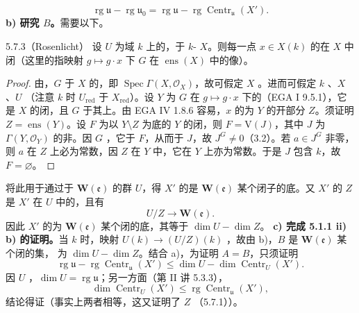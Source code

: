 \[\operatorname{rg}\mathfrak u-\operatorname{rg}\mathfrak u_0
=\operatorname{rg}\mathfrak u-\operatorname{rg}\operatorname{Centr}_{\mathfrak u}(X').\]
\textbf{b) 研究 $B$。}需要以下。
\begin{SGAresult}{}{5.7.3（Rosenlicht）}
设 $U$ 为域 $k$ 上的，于 $k$- $X$。则每一点 $x\in X(k)$ 的在 $X$ 中闭（这里的指映射 $g\mapsto g\cdot x$ 下 $G$ 在 $\operatorname{ens}(X)$ 中的像）。
\end{SGAresult}
\begin{proof}
由，$G$ 于 $X$ 的，即 $\operatorname{Spec}\Gamma(X,\mathscr O_X)$，故可假定 $X$ 。进而可假定 $k$ 、$X$ 、$U$ （注意 $k$ 时 $U_{\mathrm{red}}$ 于 $X_{\mathrm{red}}$）。设 $Y$ 为 $G$ 在 $g\mapsto g\cdot x$ 下的（EGA I 9.5.1），它是 $X$ 的闭，且 $G$ 于其上。由 EGA IV 1.8.6 容易，$x$ 的为 $Y$ 的开部分 $Z$。须证明 $Z=\operatorname{ens}(Y)$。设 $F$ 为以 $Y\setminus Z$ 为底的 $Y$ 的闭，则 $F=\mathrm V(J)$，其中 $J$ 为 $\Gamma(Y,\mathscr O_Y)$ 的非。因 $G$ ，它于 $F$，从而于 $J$，故 $J^G\ne0$（3.2）。若 $a\in J^G$ 非零，则 $a$ 在 $Z$ 上必为常数，因 $Z$ 在 $Y$ 中，它在 $Y$ 上亦为常数。于是 $J$ 包含 $k$，故 $F=\varnothing$。
\end{proof}
将此用于通过于 $\mathbf W(\mathfrak e)$ 的群 $U$，得 $X'$ 的是 $\mathbf W(\mathfrak e)$ 某个闭子的底。又 $X'$ 的 $Z$ 是 $X'$ 在 $U$ 中的，且有
\[U/Z\longrightarrow\mathbf W(\mathfrak e).\]
因此 $X'$ 的为 $\mathbf W(\mathfrak e)$ 某个闭的底，其等于 $\dim U-\dim Z$。
\textbf{c) 完成 5.1.1 ii) b) 的证明。}当 $k$ 时，映射 $U(k)\to(U/Z)(k)$ ，故由 b)，$B$ 是 $\mathbf W(\mathfrak e)$ 某个闭的集，
为 $\dim U-\dim Z$。结合 a)，为证明 $A=B$，只须证明
\[\operatorname{rg}\mathfrak u-\operatorname{rg}\operatorname{Centr}_{\mathfrak u}(X')
\leq\dim U-\dim\operatorname{Centr}_U(X').\]
因 $U$ ，$\dim U=\operatorname{rg}\mathfrak u$；另一方面（第 II 讲 5.3.3），
\[\dim\operatorname{Centr}_U(X')\leq\operatorname{rg}\operatorname{Centr}_{\mathfrak u}(X'),\]
结论得证（事实上两者相等，这又证明了 $Z$ （5.7.1））。


